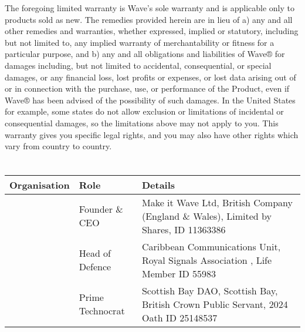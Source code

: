 \documentclass[letterpaper,10pt,english]{sphinxmanual}
\begin{document}
The foregoing limited warranty is Wave’s sole warranty and is applicable only to products sold as new. The remedies provided herein are in lieu of a) any and all other remedies and warranties, whether expressed, implied or statutory, including but not limited to, any implied warranty of merchantability or fitness for a particular purpose, and b) any and all obligations and liabilities of Wave® for damages including, but not limited to accidental, consequential, or special damages, or any financial loss, lost profits or expenses, or lost data arising out of or in connection with the purchase, use, or performance of the Product, even if Wave® has been advised of the possibility of such damages. In the United States for example, some states do not allow exclusion or limitations of incidental or consequential damages, so the limitations above may not apply to you. This warranty gives you specific legal rights, and you may also have other rights which vary from country to country.


\chapter{}
\label{\detokenize{index:document-author-s}}


\begin{savenotes}\sphinxattablestart
\centering
\begin{tabulary}{\linewidth}[t]{|T|T|T|}
\hline
\sphinxstyletheadfamily 
Organisation
&\sphinxstyletheadfamily 
Role
&\sphinxstyletheadfamily 
Details
\\
\hline
\noindent{}
&
Founder \& CEO
&
Make it Wave Ltd, British Company (England \& Wales), Limited by Shares, ID 11363386
\\
\hline
\noindent{}
&
Head of Defence
&
Caribbean Communications Unit, Royal Signals Association , Life Member ID 55983
\\
\hline
\noindent{}
&
Prime Technocrat
&
Scottish Bay DAO, Scottish Bay, British Crown Public Servant, 2024 Oath ID 25148537
\\
\hline
\end{tabulary}
\par
\sphinxattableend\end{savenotes}
\end{document}
